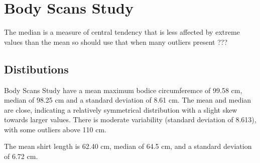 \section{Body Scans Study}

The median is a measure of central tendency that is less affected by extreme values than the mean so should use that when many outliers present ???

\subsection{Distibutions}
Body Scans Study have a mean maximum bodice circumferemce of 99.58 cm, median of 98.25 cm and a standard deviation of 8.61 cm. The mean and median are close, indicating a relatively symmetrical distribution with a slight skew towards larger values. There is moderate variability (standard deviation of 8.613), with some outliers above 110 cm.

The mean shirt length is 62.40 cm, median of 64.5 cm, and a standard deviation of 6.72 cm. 

